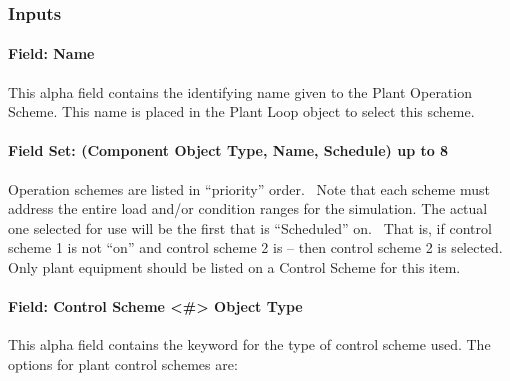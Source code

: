 \subsubsection{Inputs}\label{inputs-033}

\paragraph{Field: Name}\label{field-name-032}

This alpha field contains the identifying name given to the Plant Operation Scheme. This name is placed in the Plant Loop object to select this scheme.

\paragraph{Field Set: (Component Object Type, Name, Schedule) up to 8}\label{field-set-component-object-type-name-schedule-up-to-8}

Operation schemes are listed in ``priority'' order.~ Note that each scheme must address the entire load and/or condition ranges for the simulation. The actual one selected for use will be the first that is ``Scheduled'' on.~ That is, if control scheme 1 is not ``on'' and control scheme 2 is -- then control scheme 2 is selected. Only plant equipment should be listed on a Control Scheme for this item.

\paragraph{Field: Control Scheme \textless{}\#\textgreater{} Object Type}\label{field-control-scheme-object-type}

This alpha field contains the keyword for the type of control scheme used. The options for plant control schemes are:


